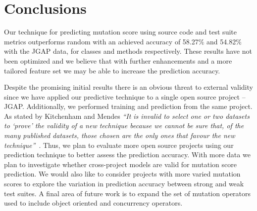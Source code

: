 \section{Conclusions}
\label{sec:conclusions_conclusions}
Our technique for predicting mutation score using source code and test suite metrics outperforms random with an achieved accuracy of 58.27\% and 54.82\% with the JGAP data, for classes and methods respectively. These results have not been optimized and we believe that with further enhancements and a more tailored feature set we may be able to increase the prediction accuracy.

Despite the promising initial results there is an obvious threat to external validity since we have applied our predictive technique to a single open source project -- JGAP. Additionally, we performed training and prediction from the same project. As stated by Kitchenham and Mendes \textit{``It is invalid to select one or two datasets to `prove' the validity of a new technique because we cannot be sure that, of the many published datasets, those chosen are the only ones that favour the new technique''}~\cite{KM09}. Thus, we plan to evaluate more open source projects using our prediction technique to better assess the prediction accuracy. With more data we plan to investigate whether cross-project models are valid for mutation score prediction. We would also like to consider projects with more varied mutation scores to explore the variation in prediction accuracy between strong and weak test suites. A final area of future work is to expand the set of mutation operators used to include object oriented and concurrency operators.
